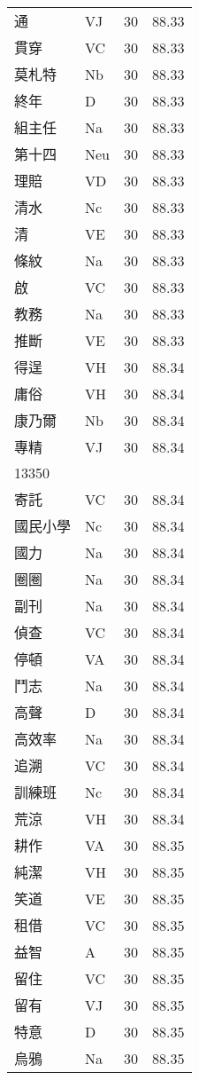 \documentclass[twocolumn]{book}
\begin{document}
\begin{supertabular}{llrr}
通 & VJ & 30 &  88.33\\
貫穿 & VC & 30 &  88.33\\
莫札特 & Nb & 30 &  88.33\\
終年 & D & 30 &  88.33\\
組主任 & Na & 30 &  88.33\\
第十四 & Neu & 30 &  88.33\\
理賠 & VD & 30 &  88.33\\
清水 & Nc & 30 &  88.33\\
清 & VE & 30 &  88.33\\
條紋 & Na & 30 &  88.33\\
啟 & VC & 30 &  88.33\\
教務 & Na & 30 &  88.33\\
推斷 & VE & 30 &  88.33\\
得逞 & VH & 30 &  88.34\\
庸俗 & VH & 30 &  88.34\\
康乃爾 & Nb & 30 &  88.34\\
專精 & VJ & 30 &  88.34\\
13350\\
寄託 & VC & 30 &  88.34\\
國民小學 & Nc & 30 &  88.34\\
國力 & Na & 30 &  88.34\\
圈圈 & Na & 30 &  88.34\\
副刊 & Na & 30 &  88.34\\
偵查 & VC & 30 &  88.34\\
停頓 & VA & 30 &  88.34\\
鬥志 & Na & 30 &  88.34\\
高聲 & D & 30 &  88.34\\
高效率 & Na & 30 &  88.34\\
追溯 & VC & 30 &  88.34\\
訓練班 & Nc & 30 &  88.34\\
荒涼 & VH & 30 &  88.34\\
耕作 & VA & 30 &  88.35\\
純潔 & VH & 30 &  88.35\\
笑道 & VE & 30 &  88.35\\
租借 & VC & 30 &  88.35\\
益智 & A & 30 &  88.35\\
留住 & VC & 30 &  88.35\\
留有 & VJ & 30 &  88.35\\
特意 & D & 30 &  88.35\\
烏鴉 & Na & 30 &  88.35\\

\end{supertabular}
\end{document}
